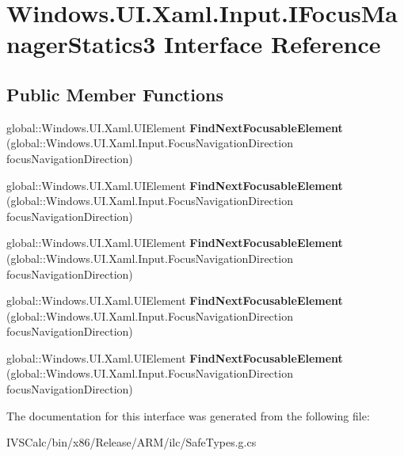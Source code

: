 \hypertarget{interface_windows_1_1_u_i_1_1_xaml_1_1_input_1_1_i_focus_manager_statics3}{}\section{Windows.\+U\+I.\+Xaml.\+Input.\+I\+Focus\+Manager\+Statics3 Interface Reference}
\label{interface_windows_1_1_u_i_1_1_xaml_1_1_input_1_1_i_focus_manager_statics3}
\subsection*{Public Member Functions}
\begin{DoxyCompactItemize}
\item 
\mbox{\label{interface_windows_1_1_u_i_1_1_xaml_1_1_input_1_1_i_focus_manager_statics3_a882c296b23bc0c4b7ceafc973bd5af05}} 
global\+::\+Windows.\+U\+I.\+Xaml.\+U\+I\+Element {\bfseries Find\+Next\+Focusable\+Element} (global\+::\+Windows.\+U\+I.\+Xaml.\+Input.\+Focus\+Navigation\+Direction focus\+Navigation\+Direction)
\item 
\mbox{\label{interface_windows_1_1_u_i_1_1_xaml_1_1_input_1_1_i_focus_manager_statics3_a882c296b23bc0c4b7ceafc973bd5af05}} 
global\+::\+Windows.\+U\+I.\+Xaml.\+U\+I\+Element {\bfseries Find\+Next\+Focusable\+Element} (global\+::\+Windows.\+U\+I.\+Xaml.\+Input.\+Focus\+Navigation\+Direction focus\+Navigation\+Direction)
\item 
\mbox{\label{interface_windows_1_1_u_i_1_1_xaml_1_1_input_1_1_i_focus_manager_statics3_a882c296b23bc0c4b7ceafc973bd5af05}} 
global\+::\+Windows.\+U\+I.\+Xaml.\+U\+I\+Element {\bfseries Find\+Next\+Focusable\+Element} (global\+::\+Windows.\+U\+I.\+Xaml.\+Input.\+Focus\+Navigation\+Direction focus\+Navigation\+Direction)
\item 
\mbox{\label{interface_windows_1_1_u_i_1_1_xaml_1_1_input_1_1_i_focus_manager_statics3_a882c296b23bc0c4b7ceafc973bd5af05}} 
global\+::\+Windows.\+U\+I.\+Xaml.\+U\+I\+Element {\bfseries Find\+Next\+Focusable\+Element} (global\+::\+Windows.\+U\+I.\+Xaml.\+Input.\+Focus\+Navigation\+Direction focus\+Navigation\+Direction)
\item 
\mbox{\label{interface_windows_1_1_u_i_1_1_xaml_1_1_input_1_1_i_focus_manager_statics3_a882c296b23bc0c4b7ceafc973bd5af05}} 
global\+::\+Windows.\+U\+I.\+Xaml.\+U\+I\+Element {\bfseries Find\+Next\+Focusable\+Element} (global\+::\+Windows.\+U\+I.\+Xaml.\+Input.\+Focus\+Navigation\+Direction focus\+Navigation\+Direction)
\end{DoxyCompactItemize}


The documentation for this interface was generated from the following file\+:\begin{DoxyCompactItemize}
\item 
I\+V\+S\+Calc/bin/x86/\+Release/\+A\+R\+M/ilc/Safe\+Types.\+g.\+cs\end{DoxyCompactItemize}
